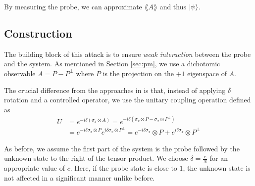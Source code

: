 \documentclass[]{article}
\newcommand*{\xo}{\otimes}
\begin{document}
By measuring the probe, we can approximate $\lang A\rang$ and thus $\ket{\psi}$. 

\subsection{Construction}
The building block of this attack is to ensure \textit{weak interaction} between the probe and the system. As mentioned in Section \ref{sec:pm}, we use a dichotomic observable $A = P - P^\perp$ where $P$ is the projection on the $+1$ eigenspace of $A$. 

The crucial difference from the approaches in \label{sec:wiesner_attack} is that, instead of applying $\delta$ rotation and a controlled operator, we use the unitary coupling operation defined as 
\begin{align}
    U &= e^{-i \delta (\sigma_x \xo A)} =  e^{-i \delta (\sigma_x \xo P - \sigma_x \xo P^\perp)} \\
    &= e^{-i \delta \sigma_x \xo P} e^ {i\delta \sigma_x \xo P^\perp} = e^{-i \delta \sigma_x} \xo P + e^{i \delta \sigma_x} \xo P^{\perp} 
\end{align}

As before, we assume the first part of the system is the probe followed by the unknown state to the right of the tensor product. We choose $\delta = \frac{c}{N}$ for an appropriate value of $c$. Here, if the probe state is close to $1$, the unknown state is not affected in a significant manner unlike before. 
\end{document}
